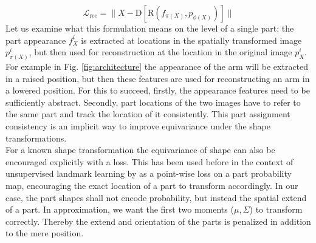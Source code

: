 	\begin{equation}
	\mathcal{L}_{\textrm{rec}}= \lVert  X  - \mathrm{D}[\mathrm{R}(f_{\pi(X)}, p_{\phi(X)})]\rVert
	\end{equation}
	\label{eq:loss_rec}
	Let us examine what this formulation means on the level of a single part: the part appearance $f^i_X$ is extracted at locations in the spatially transformed image $p^i_{\pi(X)}$, but then used for reconstruction at the location in the original image $p^i_{X}$. For example in Fig.  \ref{fig:architecture} the appearance of the arm will be extracted in a raised position, but then these features are used for reconstructing an arm in a lowered position. For this to succeed, firstly, the appearance features need to be sufficiently abstract. Secondly, part locations of the two images have to refer to the same part and track the location of it consistently. This part assignment consistency is an implicit way to improve equivariance under the shape transformations.\\
	For a known shape transformation the equivariance of shape can also be encouraged explicitly with a loss. This has been used before in the context of unsupervised landmark learning by \cite{thewlis17, zhang18} as a point-wise loss on a part probability map, encouraging the exact location of a part to transform accordingly. In our case, the part shapes shall not encode probability, but instead the spatial extend of a part. In approximation, we want the first two moments ($\mu, \Sigma$) to transform correctly. Thereby the extend and orientation of the parts is penalized in addition to the mere position.

